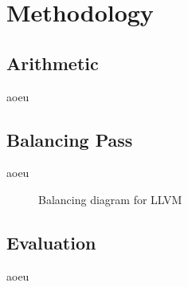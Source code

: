 \section{Methodology}
\label{methodology}
\subsection{Arithmetic}
aoeu
\subsection{Balancing Pass}
aoeu
\begin{figure}[h]
  \caption{Balancing diagram for LLVM}
  \label{fig:balancing}
\end{figure}

\subsection{Evaluation}
aoeu
